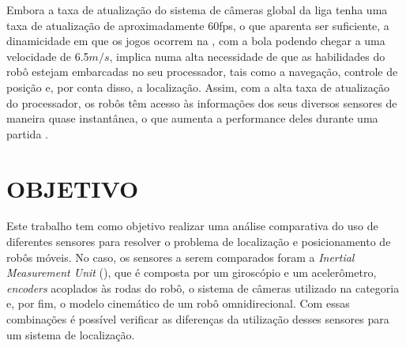 \documentclass[acronym, symbols, table, deposito]{fei}
\begin{document}
	Embora a taxa de atualização do sistema de câmeras global da liga tenha uma taxa de atualização de aproximadamente 60fps, o que aparenta ser suficiente, a dinamicidade em que os jogos ocorrem na , com a bola podendo chegar a uma velocidade de 6.5$m/s$, implica numa alta necessidade de que as habilidades do robô estejam embarcadas no seu processador, tais como a navegação, controle de posição e, por conta disso, a localização. Assim, com a alta taxa de atualização do processador, os robôs têm acesso às informações dos seus diversos sensores de maneira quase instantânea, o que aumenta a performance deles durante uma partida \cite{ubc_thunderbots_2015}.

%	
	

%	
	
	\section{OBJETIVO}
	
		Este trabalho tem como objetivo realizar uma análise comparativa do uso de diferentes sensores para resolver o problema de localização e posicionamento de robôs móveis. No caso, os sensores a serem comparados foram a \textit{Inertial Measurement Unit} (), que é composta por um giroscópio e um acelerômetro, \textit{encoders} acoplados às rodas do robô, o sistema de câmeras utilizado na categoria  e, por fim, o modelo cinemático de um robô omnidirecional. Com essas combinações é possível verificar as diferenças da utilização desses sensores para um sistema de localização.
	
\end{document}
